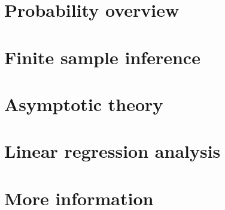 \documentclass[12pt,notitlepage]{report}
\begin{document}
\part{Probability overview}


\begin{appendices}

\end{appendices}

\newcommand*\FancyVerbStartString{## block}
\part{Finite sample inference}










\begin{appendices}

\end{appendices}

\part{Asymptotic theory}





\begin{appendices}

\end{appendices}

\part{Linear regression analysis}





\begin{appendices}

\end{appendices}

\part{More information}
\begin{appendices}


\end{appendices}

{
\raggedright

}
\end{document}
